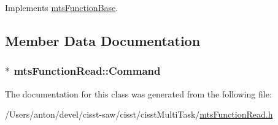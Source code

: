 Implements \hyperlink{classmts_function_base_ae6e5497be34d5563f2df3cb24d68e959}{mts\+Function\+Base}.



\subsection{Member Data Documentation}
\hypertarget{classmts_function_read_a42b24c58d52e1f0a2aa8bacaebc0f8b3}{}
\subsubsection[{Command}]{$\ast$ mts\+Function\+Read\+::\+Command\hspace{0.3cm}{\ttfamily [protected]}}\label{classmts_function_read_a42b24c58d52e1f0a2aa8bacaebc0f8b3}


The documentation for this class was generated from the following file\+:\begin{DoxyCompactItemize}
\item 
/\+Users/anton/devel/cisst-\/saw/cisst/cisst\+Multi\+Task/\hyperlink{mts_function_read_8h}{mts\+Function\+Read.\+h}\end{DoxyCompactItemize}
